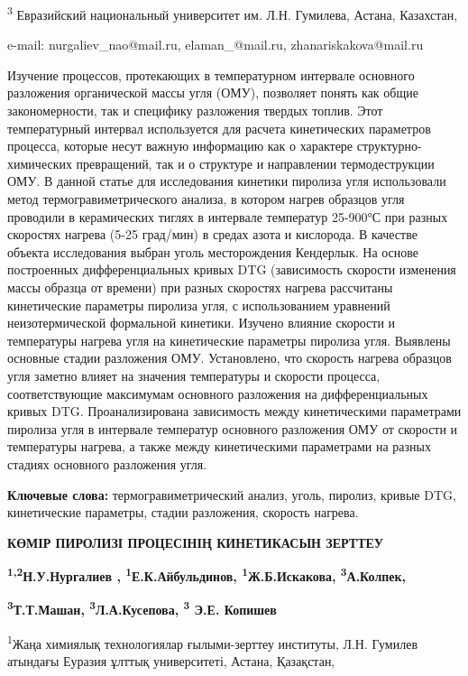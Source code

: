 \textsuperscript{3} Евразийский национальный университет им. Л.Н.
Гумилева, Астана, Казахстан,

e-mail: nurgaliev\_nao@mail.ru, elaman\_@mail.ru, zhanariskakova@mail.ru

Изучение процессов, протекающих в температурном интервале основного
разложения органической массы угля (ОМУ), позволяет понять как общие
закономерности, так и специфику разложения твердых топлив. Этот
температурный интервал используется для расчета кинетических параметров
процесса, которые несут важную информацию как о характере
структурно-химических превращений, так и о структуре и направлении
термодеструкции ОМУ. В данной статье для исследования кинетики пиролиза
угля использовали метод термогравиметрического анализа, в котором нагрев
образцов угля проводили в керамических тиглях в интервале температур
25-900°С при разных скоростях нагрева (5-25 град/мин) в средах азота и
кислорода. В качестве объекта исследования выбран уголь месторождения
Кендерлык. На основе построенных дифференциальных кривых DTG
(зависимость скорости изменения массы образца от времени) при разных
скоростях нагрева рассчитаны кинетические параметры пиролиза угля, с
использованием уравнений неизотермической формальной кинетики. Изучено
влияние скорости и температуры нагрева угля на кинетические параметры
пиролиза угля. Выявлены основные стадии разложения ОМУ. Установлено, что
скорость нагрева образцов угля заметно влияет на значения температуры и
скорости процесса, соответствующие максимумам основного разложения на
дифференциальных кривых DTG. Проанализирована зависимость между
кинетическими параметрами пиролиза угля в интервале температур основного
разложения ОМУ от скорости и температуры нагрева, а также между
кинетическими параметрами на разных стадиях основного разложения угля.

\textbf{Ключевые слова:} термогравиметрический анализ, уголь, пиролиз,
кривые DTG, кинетические параметры, стадии разложения, скорость нагрева.

\textbf{КӨМІР ПИРОЛИЗІ ПРОЦЕСІНІҢ КИНЕТИКАСЫН ЗЕРТТЕУ}

\textbf{\textsuperscript{1,2}Н.У.Нургалиев ,
\textsuperscript{1}Е.К.Айбульдинов, \textsuperscript{1}Ж.Б.Искакова,
\textsuperscript{3}А.Колпек,}

\textbf{\textsuperscript{3}Т.Т.Машан, \textsuperscript{3}Л.А.Кусепова,
\textsuperscript{3} Э.Е. Копишев}

\textsuperscript{1}Жаңа химиялық технологиялар ғылыми-зерттеу институты,
Л.Н. Гумилев атындағы Еуразия ұлттық университеті, Астана, Қазақстан,

